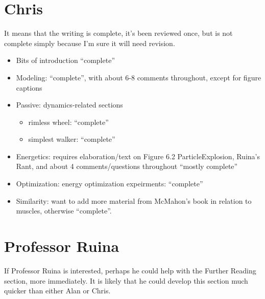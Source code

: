 \section*{Chris}

It means that the writing is complete, it's been reviewed once, but is not complete simply because I'm sure it will need revision.

\begin{itemize}
\item Bits of introduction ``complete''
\item Modeling: ``complete'', with about 6-8 comments throughout, except for figure captions
\item Passive: dynamics-related sections

\begin{itemize}
\item rimless wheel: ``complete''
\item simplest walker: ``complete''
\end{itemize}

\item Energetics: requires elaboration/text on Figure 6.2 ParticleExplosion, Ruina's Rant, and about 4 comments/questions throughout ``mostly complete''
\item Optimization: energy optimization expeirments: ``complete''
\item Similarity: want to add more material from McMahon's book in relation to muscles, otherwise ``complete''.
\end{itemize}

\section*{Professor Ruina}

If Professor Ruina is interested, perhaps he could help with the Further Reading section, more immediately. It is likely that he could develop this section much quicker than either Alan or Chris.